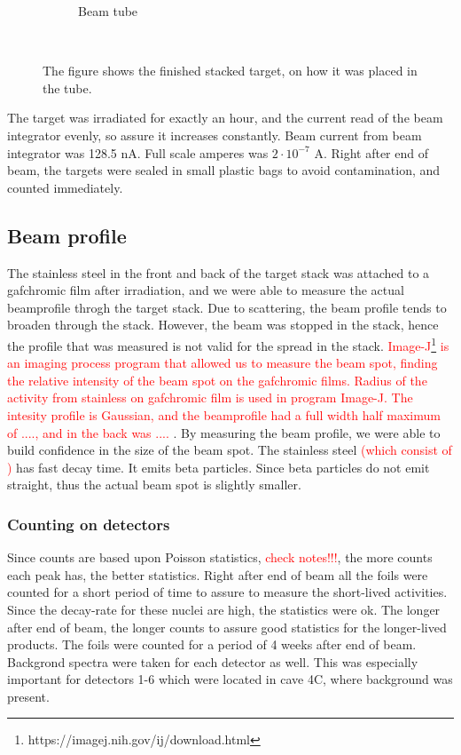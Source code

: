 \begin{figure}
\begin{subfigure}[b]{0.3\textwidth}
        \caption{Beam tube}
        \label{fig:tube}
    \end{subfigure}
    ~ %
    \caption{The figure shows the finished stacked target, on how it was placed in the tube. }\label{fig:finished_stack}
\end{figure}
\noindent
The target was irradiated for exactly an hour, and the current read of the beam integrator evenly, so assure it increases constantly. Beam current from beam integrator was 128.5 nA. Full scale amperes was $2\cdot 10^{-7} $ A. Right after end of beam, the targets were sealed in small plastic bags to avoid contamination, and counted immediately. 


\subsection{Beam profile}
The stainless steel in the front and back of the target stack was attached to a gafchromic film after irradiation, and we were able to measure the actual beamprofile throgh the target stack. Due to scattering, the beam profile tends to broaden through the stack. However, the beam was stopped in the stack, hence the profile that was measured is not valid for the spread in the stack. \textcolor{red}{Image-J\footnote{https://imagej.nih.gov/ij/download.html} is an imaging process program that allowed us to measure the beam spot, finding the relative intensity of the beam spot on the gafchromic films. Radius of the activity from stainless on gafchromic film is used in program Image-J. The intesity profile is Gaussian, and the beamprofile had a full width half maximum of ...., and in the back was .... }. By measuring the beam profile, we were able to build confidence in the size of the beam spot. The stainless steel \textcolor{red}{(which consist of )} has fast decay time. It emits beta particles. Since beta particles do not emit straight, thus the actual beam spot is slightly smaller.   

\subsubsection{Counting on detectors}
Since counts are based upon Poisson statistics, \textcolor{red}{check notes!!!}, the more counts each peak has, the better statistics. Right after end of beam all the foils were counted for a short period of time to assure to measure the short-lived activities. Since the decay-rate for these nuclei are high, the statistics were ok. The longer after end of beam, the longer counts to assure good statistics for the longer-lived products. The foils were counted for a period of 4 weeks after end of beam. Backgrond spectra were taken for each detector as well. This was especially important for detectors 1-6 which were located in cave 4C, where background was present. 
